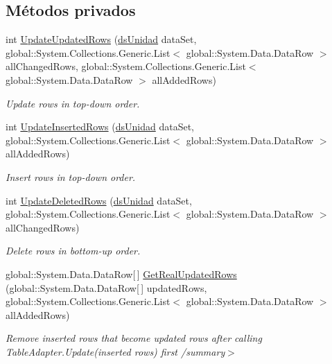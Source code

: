 \subsection*{Métodos privados}
\begin{DoxyCompactItemize}
\item 
int \hyperlink{class_proyecto___integrador__3_1_1ds_unidad_table_adapters_1_1_table_adapter_manager_a1762fa6691cf10d2bd733b9b28d6cb78}{Update\-Updated\-Rows} (\hyperlink{class_proyecto___integrador__3_1_1ds_unidad}{ds\-Unidad} data\-Set, global\-::\-System.\-Collections.\-Generic.\-List$<$ global\-::\-System.\-Data.\-Data\-Row $>$ all\-Changed\-Rows, global\-::\-System.\-Collections.\-Generic.\-List$<$ global\-::\-System.\-Data.\-Data\-Row $>$ all\-Added\-Rows)
\begin{DoxyCompactList}\small\item\em Update rows in top-\/down order. \end{DoxyCompactList}\item 
int \hyperlink{class_proyecto___integrador__3_1_1ds_unidad_table_adapters_1_1_table_adapter_manager_aa6daba3bfb296d904aef4be4e00b651d}{Update\-Inserted\-Rows} (\hyperlink{class_proyecto___integrador__3_1_1ds_unidad}{ds\-Unidad} data\-Set, global\-::\-System.\-Collections.\-Generic.\-List$<$ global\-::\-System.\-Data.\-Data\-Row $>$ all\-Added\-Rows)
\begin{DoxyCompactList}\small\item\em Insert rows in top-\/down order. \end{DoxyCompactList}\item 
int \hyperlink{class_proyecto___integrador__3_1_1ds_unidad_table_adapters_1_1_table_adapter_manager_a3cbe0d89e42e22b2c236f8c3dc69432f}{Update\-Deleted\-Rows} (\hyperlink{class_proyecto___integrador__3_1_1ds_unidad}{ds\-Unidad} data\-Set, global\-::\-System.\-Collections.\-Generic.\-List$<$ global\-::\-System.\-Data.\-Data\-Row $>$ all\-Changed\-Rows)
\begin{DoxyCompactList}\small\item\em Delete rows in bottom-\/up order. \end{DoxyCompactList}\item 
global\-::\-System.\-Data.\-Data\-Row\mbox{[}$\,$\mbox{]} \hyperlink{class_proyecto___integrador__3_1_1ds_unidad_table_adapters_1_1_table_adapter_manager_a886b0eff24cf3bb231a4fcffef18db71}{Get\-Real\-Updated\-Rows} (global\-::\-System.\-Data.\-Data\-Row\mbox{[}$\,$\mbox{]} updated\-Rows, global\-::\-System.\-Collections.\-Generic.\-List$<$ global\-::\-System.\-Data.\-Data\-Row $>$ all\-Added\-Rows)
\begin{DoxyCompactList}\small\item\em Remove inserted rows that become updated rows after calling Table\-Adapter.\-Update(inserted rows) first /summary$>$ \end{DoxyCompactList}\end{DoxyCompactItemize}
